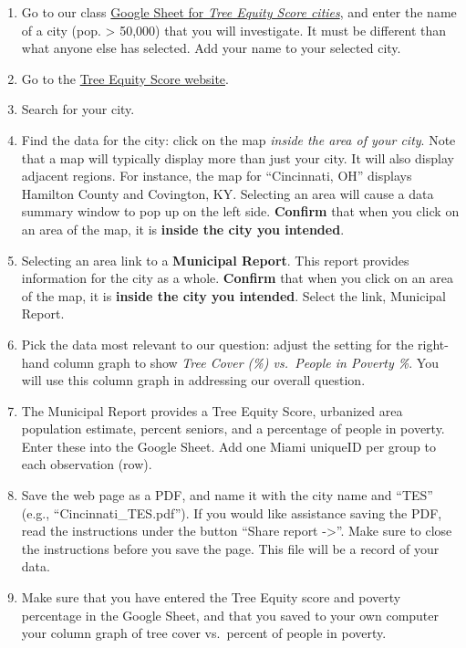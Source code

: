 \documentclass[
  letterpaper,
  DIV=11,
  numbers=noendperiod]{scrreprt}
\providecommand{\tightlist}{%
  \setlength{\itemsep}{0pt}\setlength{\parskip}{0pt}}
\begin{document}
\begin{enumerate}
\def\labelenumi{\arabic{enumi}.}
\tightlist
\item
  Go to our class
  \href{https://docs.google.com/spreadsheets/d/1SB9Hk62cmZUZkeh5BGaIegEG79c9ylnV7STaLeFVrVo/edit?usp=sharing}{Google
  Sheet for \emph{Tree Equity Score cities}}, and enter the name of a
  city (pop. \textgreater{} 50,000) that you will investigate. It must
  be different than what anyone else has selected. Add your name to your
  selected city.
\item
  Go to the \href{https://treeequityscore.org/}{Tree Equity Score
  website}.
\item
  Search for your city.
\item
  Find the data for the city: click on the map \emph{inside the area of
  your city}. Note that a map will typically display more than just your
  city. It will also display adjacent regions. For instance, the map for
  ``Cincinnati, OH'' displays Hamilton County and Covington, KY.
  Selecting an area will cause a data summary window to pop up on the
  left side. \textbf{Confirm} that when you click on an area of the map,
  it is \textbf{inside the city you intended}.
\item
  Selecting an area link to a \textbf{Municipal Report}. This report
  provides information for the city as a whole. \textbf{Confirm} that
  when you click on an area of the map, it is \textbf{inside the city
  you intended}. Select the link, Municipal Report.
\item
  Pick the data most relevant to our question: adjust the setting for
  the right-hand column graph to show \emph{Tree Cover (\%) vs.~People
  in Poverty \%}. You will use this column graph in addressing our
  overall question.
\item
  The Municipal Report provides a Tree Equity Score, urbanized area
  population estimate, percent seniors, and a percentage of people in
  poverty. Enter these into the Google Sheet. Add one Miami uniqueID per
  group to each observation (row).
\item
  Save the web page as a PDF, and name it with the city name and ``TES''
  (e.g., ``Cincinnati\_TES.pdf''). If you would like assistance saving
  the PDF, read the instructions under the button ``Share report
  -\textgreater{}''. Make sure to close the instructions before you save
  the page. This file will be a record of your data.
\item
  Make sure that you have entered the Tree Equity score and poverty
  percentage in the Google Sheet, and that you saved to your own
  computer your column graph of tree cover vs.~percent of people in
  poverty.
\end{enumerate}
\end{document}
